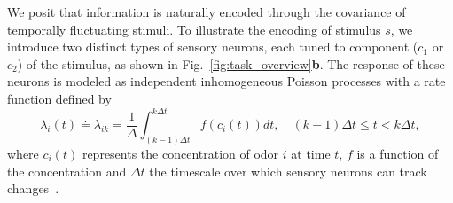 We posit that information is naturally encoded through the covariance of temporally fluctuating stimuli. 
To illustrate the encoding of stimulus \(s\), we introduce two distinct types of sensory neurons, each tuned to component (\(c_1\) or \(c_2\)) of the stimulus, as shown in Fig.~\ref{fig:task_overview}\textbf{b}.
The response of these neurons is modeled as independent inhomogeneous Poisson processes with a rate function defined by
\begin{equation}
    \lambda_i(t) \doteq \lambda_{ik} = \frac{1}{\Delta} \int_{(k-1)\Delta t}^{k\Delta t}f(c_i(t))dt, \quad  (k-1)\Delta t \leq t < k \Delta t,
    \label{eq:rate_function_define}
\end{equation}
where \(c_i(t)\) represents the concentration of odor \(i\) at time \(t\), \(f\) is a function of the concentration and \(\Delta t\) the timescale over which sensory neurons can track changes~\cite{Panzeri2010, Theunissen1995}.

